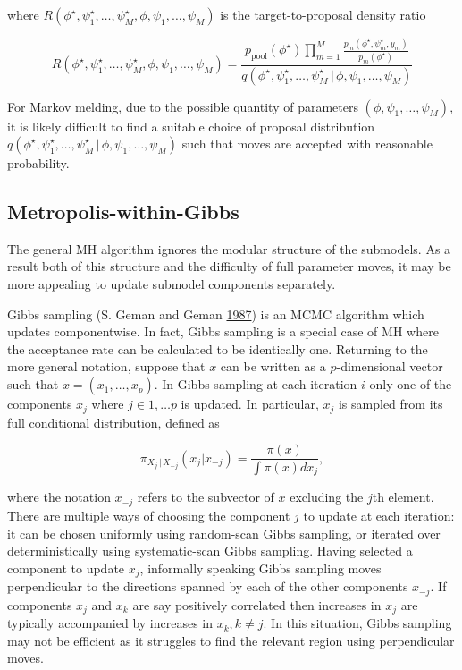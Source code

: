 \documentclass[11pt,]{book}
\begin{document}
where
\(R(\phi^\star, \psi_1^\star, \ldots, \psi_M^\star, \phi, \psi_1, \ldots, \psi_M)\)
is the target-to-proposal density ratio

\begin{equation}
R(\phi^\star, \psi_1^\star, \ldots, \psi_{M}^\star, \phi, \psi_1, \ldots, \psi_{M}) 
= \frac{p_{\mathrm{pool}}(\phi^\star) \prod_{m=1}^{M} \frac{p_m(\phi^\star, \psi_m^\star, y_m)}{p_m(\phi^\star)}}{q(\phi^\star, \psi_1^\star, \ldots, \psi_{M}^\star \, | \, \phi, \psi_1, \ldots, \psi_{M})}
\end{equation}

For Markov melding, due to the possible quantity of parameters
\((\phi, \psi_1, \ldots, \psi_{M})\), it is likely difficult to find a
suitable choice of proposal distribution
\(q(\phi^\star, \psi_1^\star, \ldots, \psi_{M}^\star \, | \, \phi, \psi_1, \ldots, \psi_{M})\)
such that moves are accepted with reasonable probability.

\subsection{Metropolis-within-Gibbs}\label{metropolis-within-gibbs}

The general MH algorithm ignores the modular structure of the submodels.
As a result both of this structure and the difficulty of full parameter
moves, it may be more appealing to update submodel components
separately.

Gibbs sampling (S. Geman and Geman
\protect\hyperlink{ref-geman1987stochastic}{1987}) is an MCMC algorithm
which updates componentwise. In fact, Gibbs sampling is a special case
of MH where the acceptance rate can be calculated to be identically one.
Returning to the more general notation, suppose that \(x\) can be
written as a \(p\)-dimensional vector such that
\(x = (x_1, \ldots, x_p)\). In Gibbs sampling at each iteration \(i\)
only one of the components \(x_j\) where \(j \in 1, \ldots p\) is
updated. In particular, \(x_j\) is sampled from its full conditional
distribution, defined as

\begin{equation}
\pi_{X_j \, | \, X_{-j}} (x_j | x_{-j}) = \frac{\pi(x)}{\int \pi(x) dx_j}, \label{eq:fullconditional}
\end{equation}

where the notation \(x_{-j}\) refers to the subvector of \(x\) excluding
the \(j\)th element. There are multiple ways of choosing the component
\(j\) to update at each iteration: it can be chosen uniformly using
random-scan Gibbs sampling, or iterated over deterministically using
systematic-scan Gibbs sampling. Having selected a component to update
\(x_j\), informally speaking Gibbs sampling moves perpendicular to the
directions spanned by each of the other components \(x_{-j}\). If
components \(x_j\) and \(x_k\) are say positively correlated then
increases in \(x_j\) are typically accompanied by increases in
\(x_k, k \neq j\). In this situation, Gibbs sampling may not be
efficient as it struggles to find the relevant region using
perpendicular moves.
\end{document}
